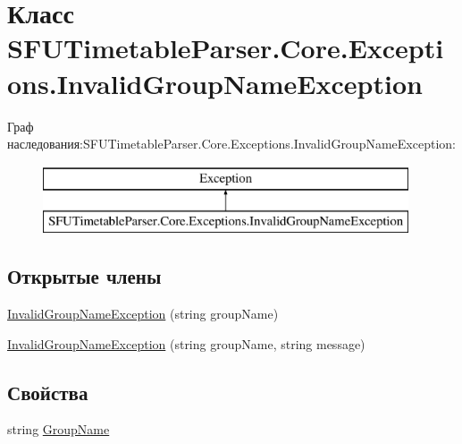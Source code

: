 \hypertarget{class_s_f_u_timetable_parser_1_1_core_1_1_exceptions_1_1_invalid_group_name_exception}{}\section{Класс S\+F\+U\+Timetable\+Parser.\+Core.\+Exceptions.\+Invalid\+Group\+Name\+Exception}
\label{class_s_f_u_timetable_parser_1_1_core_1_1_exceptions_1_1_invalid_group_name_exception}
Граф наследования\+:S\+F\+U\+Timetable\+Parser.\+Core.\+Exceptions.\+Invalid\+Group\+Name\+Exception\+:\begin{figure}[H]
\begin{center}
\leavevmode
\includegraphics[height=2.000000cm]{class_s_f_u_timetable_parser_1_1_core_1_1_exceptions_1_1_invalid_group_name_exception}
\end{center}
\end{figure}
\subsection*{Открытые члены}
\begin{DoxyCompactItemize}
\item 
\hyperlink{class_s_f_u_timetable_parser_1_1_core_1_1_exceptions_1_1_invalid_group_name_exception_ac515d9024afadd1552e8856271624a29}{Invalid\+Group\+Name\+Exception} (string group\+Name)
\item 
\hyperlink{class_s_f_u_timetable_parser_1_1_core_1_1_exceptions_1_1_invalid_group_name_exception_a73275a887b6824dc48d7b2b17e0c8331}{Invalid\+Group\+Name\+Exception} (string group\+Name, string message)
\end{DoxyCompactItemize}
\subsection*{Свойства}
\begin{DoxyCompactItemize}
\item 
string \hyperlink{class_s_f_u_timetable_parser_1_1_core_1_1_exceptions_1_1_invalid_group_name_exception_a721ab32f677d9928aa65eb266427ab5b}{Group\+Name}
\end{DoxyCompactItemize}


